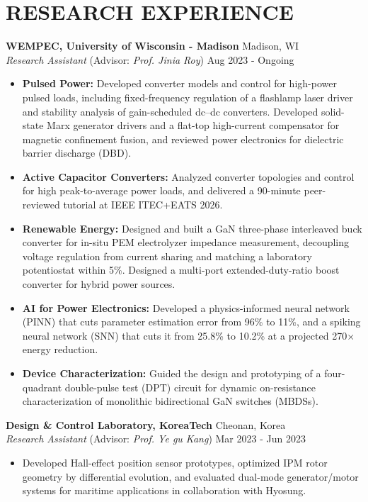 \documentclass[a4paper,9pt]{extarticle}
\begin{document}
\section*{RESEARCH EXPERIENCE}
\noindent
\textbf{WEMPEC, University of Wisconsin - Madison} \hfill Madison, WI\\ %
\textit{Research Assistant} (Advisor: \textit{Prof. Jinia Roy}) \hfill Aug 2023 - Ongoing
\begin{itemize}
    \item \textbf{Pulsed Power:} Developed converter models and control for high-power pulsed loads, including fixed-frequency regulation of a flashlamp laser driver and stability analysis of gain-scheduled dc--dc converters. Developed solid-state Marx generator drivers and a flat-top high-current compensator for magnetic confinement fusion, and reviewed power electronics for dielectric barrier discharge (DBD).
    \item \textbf{Active Capacitor Converters:} Analyzed converter topologies and control for high peak-to-average power loads, and delivered a 90-minute peer-reviewed tutorial at IEEE ITEC+EATS 2026.
    \item \textbf{Renewable Energy:} Designed and built a GaN three-phase interleaved buck converter for in-situ PEM electrolyzer impedance measurement, decoupling voltage regulation from current sharing and matching a laboratory potentiostat within 5\%. Designed a multi-port extended-duty-ratio boost converter for hybrid power sources.
    \item \textbf{AI for Power Electronics:} Developed a physics-informed neural network (PINN) that cuts parameter estimation error from 96\% to 11\%, and a spiking neural network (SNN) that cuts it from 25.8\% to 10.2\% at a projected 270$\times$ energy reduction.
    \item \textbf{Device Characterization:} Guided the design and prototyping of a four-quadrant double-pulse test (DPT) circuit for dynamic on-resistance characterization of monolithic bidirectional GaN switches (MBDSs).
\end{itemize}

\noindent
\textbf{Design \& Control Laboratory, KoreaTech} \hfill Cheonan, Korea\\
\textit{Research Assistant} (Advisor: \textit{Prof. Ye gu Kang}) \hfill Mar 2023 - Jun 2023
\begin{itemize}
    \item Developed Hall-effect position sensor prototypes, optimized IPM rotor geometry by differential evolution, and evaluated dual-mode generator/motor systems for maritime applications in collaboration with Hyosung.
\end{itemize}
\end{document}
